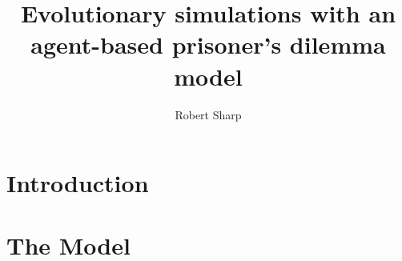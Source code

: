 \documentclass[12pt,reqno]{amsart}
\begin{document}
\title{Evolutionary simulations with an agent-based prisoner's dilemma model}

\author{Robert Sharp}
\address{2011 Monument Ave Apt 3 $\,\,\cdot\,\,$ Richmond, VA $\,\,\cdot\,\,$ 23220}



\maketitle

\section{Introduction}






\section{The Model}
\end{document}
